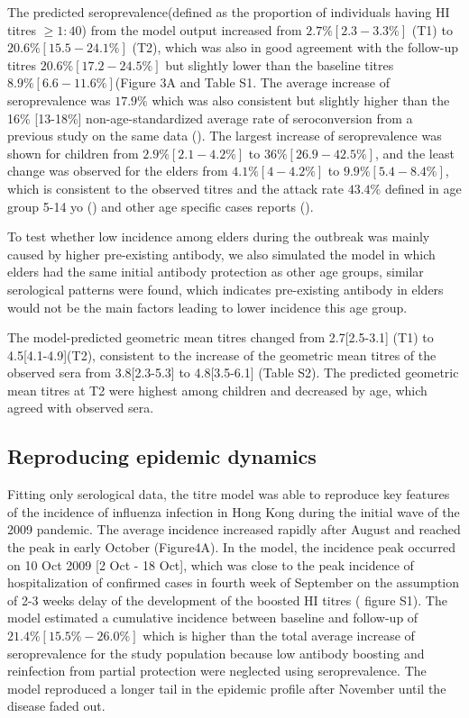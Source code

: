 \documentclass{article}
\begin{document}
The predicted seroprevalence(defined as the proportion of individuals having HI titres $\geq1:40$) from the model output increased from $2.7\%[2.3-3.3\%]$ (T1) to $20.6\%[15.5-24.1\%]$ (T2), which was also in good agreement with the follow-up titres $20.6\%[17.2-24.5\%]$ but slightly lower than the baseline titres $8.9\%[6.6-11.6\%] $(Figure 3A and Table S1. The average increase of seroprevalence was $17.9\%$ which was also consistent but slightly higher than the 16\% [13-18\%] non-age-standardized average rate of seroconversion from a previous study on the same data (\cite{Riley2011}). The largest increase of seroprevalence was shown for children from $2.9\%[2.1-4.2\%]$ to $36\%[26.9-42.5\%]$, and the least change was observed for the elders from $4.1\%[4-4.2\%]$ to $9.9\%[5.4-8.4\%]$, which is consistent to the observed titres and the attack rate $43.4\%$ defined in age group 5-14 yo (\cite{Wu2010}) and other age specific cases reports (\cite{Yang2015}).

To test whether low incidence among elders during the outbreak was mainly caused by higher pre-existing antibody, we also simulated the model in which elders had the same initial antibody protection as other age groups, similar serological patterns were found, which indicates pre-existing antibody in elders would not be the main factors leading to lower incidence this age group.

 
The model-predicted geometric mean titres changed from 2.7[2.5-3.1] (T1) to 4.5[4.1-4.9](T2), consistent to the increase of the geometric mean titres of the observed sera from 3.8[2.3-5.3] to 4.8[3.5-6.1] (Table S2). The predicted geometric mean titres at T2 were highest among children and decreased by age, which agreed with observed sera.

\subsection{Reproducing epidemic dynamics}
Fitting only serological data, the titre model was able to reproduce key features of the incidence of influenza infection in Hong Kong during the initial wave of the 2009 pandemic. The average incidence increased rapidly after August and reached the peak in early October (Figure4A). In the model, the incidence peak occurred on 10 Oct 2009 [2 Oct - 18 Oct], which was close to the peak incidence of hospitalization of confirmed cases in fourth week of September on the assumption of 2-3 weeks delay of the development of the boosted HI titres  (\cite{Wu2010} \cite{Riley2011} figure S1). The model estimated a cumulative incidence between baseline and follow-up of $21.4\% [15.5\% - 26.0\%]$ which is  higher than the total average increase of seroprevalence for the study population because low antibody boosting and reinfection from partial protection were neglected using seroprevalence. The model reproduced a longer tail in the epidemic profile after November until the disease faded out.
\end{document}
